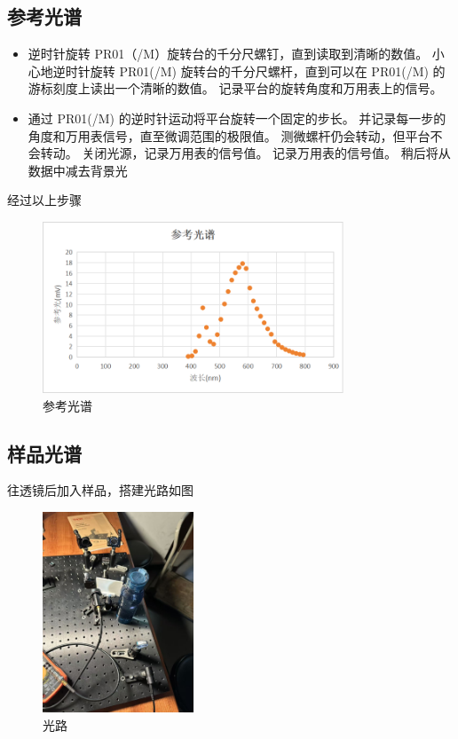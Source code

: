 \documentclass{ctexart}
\begin{document}
\subsection{参考光谱}
\begin{itemize}
    \item 逆时针旋转 PR01（/M）旋转台的千分尺螺钉，直到读取到清晰的数值。
    小心地逆时针旋转 PR01(/M) 旋转台的千分尺螺杆，直到可以在 PR01(/M) 的游标刻度上读出一个清晰的数值。
    记录平台的旋转角度和万用表上的信号。
    \item 通过 PR01(/M) 的逆时针运动将平台旋转一个固定的步长。
    并记录每一步的角度和万用表信号，直至微调范围的极限值。
    测微螺杆仍会转动，但平台不会转动。
    关闭光源，记录万用表的信号值。
    记录万用表的信号值。 稍后将从数据中减去背景光
\end{itemize}
经过以上步骤
\begin{figure}[H]
    \centering
    \includegraphics[width=0.8\textwidth]{pictures/图片1.png}
    \caption{参考光谱}
\end{figure}

\subsection{样品光谱}
往透镜后加入样品，搭建光路如图
\begin{figure}
    \centering
    \includegraphics[width=0.4\textwidth]{pictures/微信图片_20241121154954.jpg}
    \caption{光路}
\end{figure}
\end{document}
